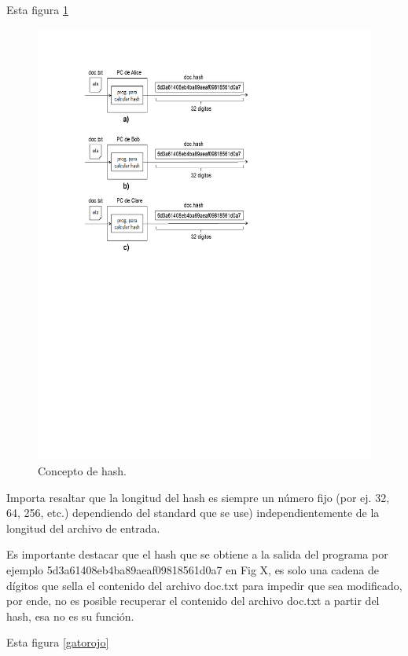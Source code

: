 \documentclass[12pt]{report} %
\begin{document}
\begin{itemize}
Esta figura \ref{imagenfirma1}


\begin{figure}
\centering
\includegraphics[width=0.85\columnwidth]{imagenes/imagenfirma1.pdf}
\caption{Concepto de hash.}
\label{imagenfirma1}
\end{figure} 

Importa resaltar que la longitud del hash es siempre un número fijo (por ej. 32, 64, 256, etc.) dependiendo del standard que se use) independientemente de la longitud del archivo de entrada. 

Es importante destacar que el hash que se obtiene a la salida del programa por ejemplo 5d3a61408eb4ba89aeaf09818561d0a7 en Fig X, es solo una cadena de dígitos que sella el contenido del archivo doc.txt para impedir que sea modificado, por ende, no es posible recuperar el contenido del archivo doc.txt a partir del hash, esa no es su función.

Esta figura \ref{gatorojo}


\end{itemize}
\end{document}

